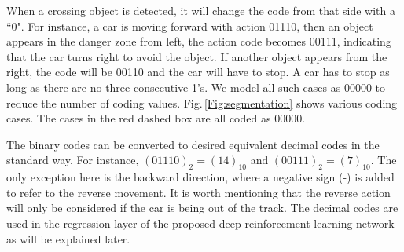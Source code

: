 \documentclass{svproc}
\begin{document}
	When a crossing object is detected, it will change the code from that side with a ``0". For instance, a car is moving forward with action 01110, then an object appears in the danger zone from left, the action code becomes 00111, indicating that the car turns right to avoid the object. If another object appears from the right, the code will be 00110 and the car will have to stop. A car has to stop as long as there are no three consecutive 1's. We model all such cases as 00000 to reduce the number of coding values. Fig.\,\ref{Fig:segmentation} shows various coding cases. The cases in the red dashed box are all coded as 00000.
	
	The binary codes can be converted to desired equivalent decimal codes in the standard way. For instance, $(01110)_2=(14)_{10}$ and $(00111)_2=(7)_{10}$. The only exception here is the backward direction, where a negative sign (-) is added to refer to the reverse movement. It is worth mentioning that the reverse action will only be considered if the car is being out of the track. The decimal codes are used in the regression layer of the proposed deep reinforcement learning network as will be explained later. 
	
\end{document}
